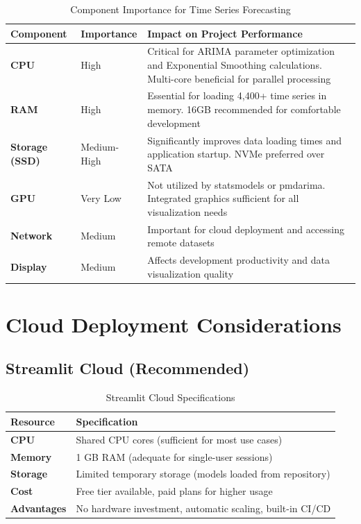 \begin{table}[H]
	\centering
	\caption{Component Importance for Time Series Forecasting}
	\begin{tabular}{|p{3cm}|p{3cm}|p{7cm}|}
		\hline
		\textbf{Component} & \textbf{Importance} & \textbf{Impact on Project Performance} \\
		\hline
		\textbf{CPU} & High & Critical for ARIMA parameter optimization and Exponential Smoothing calculations. Multi-core beneficial for parallel processing \\
		\hline
		\textbf{RAM} & High & Essential for loading 4,400+ time series in memory. 16GB recommended for comfortable development \\
		\hline
		\textbf{Storage (SSD)} & Medium-High & Significantly improves data loading times and application startup. NVMe preferred over SATA \\
		\hline
		\textbf{GPU} & Very Low & Not utilized by statsmodels or pmdarima. Integrated graphics sufficient for all visualization needs \\
		\hline
		\textbf{Network} & Medium & Important for cloud deployment and accessing remote datasets \\
		\hline
		\textbf{Display} & Medium & Affects development productivity and data visualization quality \\
		\hline
	\end{tabular}
	\label{tab:performance-analysis}
\end{table}

\section*{Cloud Deployment Considerations}

\subsection*{Streamlit Cloud (Recommended)}

\begin{table}[H]
	\centering
	\caption{Streamlit Cloud Specifications}
	\begin{tabular}{|p{3cm}|p{10cm}|}
		\hline
		\textbf{Resource} & \textbf{Specification} \\
		\hline
		\textbf{CPU} & Shared CPU cores (sufficient for most use cases) \\
		\hline
		\textbf{Memory} & 1 GB RAM (adequate for single-user sessions) \\
		\hline
		\textbf{Storage} & Limited temporary storage (models loaded from repository) \\
		\hline
		\textbf{Cost} & Free tier available, paid plans for higher usage \\
		\hline
		\textbf{Advantages} & No hardware investment, automatic scaling, built-in CI/CD \\
		\hline
	\end{tabular}
	\label{tab:streamlit-cloud}
\end{table}

